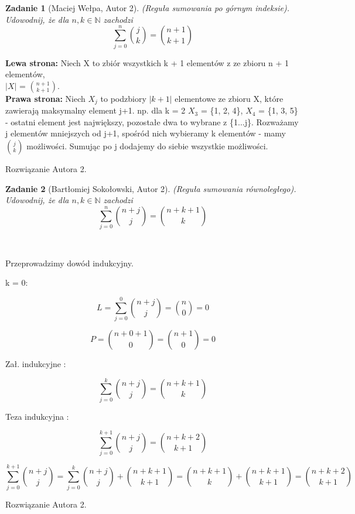 \documentclass{mwart}
\newtheorem{zad}{Zadanie}[section]
\begin{document}
\begin{zad}[Maciej Wełpa, Autor 2]
    (Reguła sumowania po górnym indeksie). Udowodnij, że dla
    $n, k \in \mathbb{N}$ zachodzi
    \[\sum_{j=0}^n\binom{j}{k} = \binom{n+1}{k+1}\]
\end{zad}
\begin{mdframed}
    \textbf{Lewa strona:}
    Niech X to zbiór wszystkich k + 1 elementów z ze zbioru n + 1 elementów, \\
    \(|X|\) = \(\binom{n + 1}{k + 1}\). \\
    \textbf{Prawa strona:} Niech \( X_j \) to podzbiory \(|k+1|\) elementowe ze zbioru X, które
    zawierają maksymalny element j+1. np. dla k = 2 \( X_3 \) = \{1, 2, 4\}, \( X_4 \) = \{1, 3, 5\}
    - ostatni element jest największy, pozostałe dwa to wybrane z \{1...j\}. Rozważamy j elementów mniejszych od j+1, spośród nich wybieramy k elementów - mamy \(\binom{j}{k}\) możliwości. Sumując po j dodajemy do siebie wszystkie możliwości.
\end{mdframed}
\begin{mdframed}
    Rozwiązanie Autora 2.
\end{mdframed}




\begin{zad}[Bartłomiej Sokołowski, Autor 2]
    (Reguła sumowania równoległego). Udowodnij, że dla $n, k \in \mathbb{N}$
    zachodzi \[ \sum_{j= 0}^{n}\binom{n+j}{j} = \binom{n+k+1}{k}   \]
\end{zad}\
\begin{mdframed}
    Przeprowadzimy dowód indukcyjny.
    \item k = 0:
    \item \[ L = \sum_{j=0}^{0}\binom{n+j}{j} = \binom{n}{0} = 0 \]
    \item \[P = \binom{n+0+1}{0} = \binom{n+1}{0} = 0\]
    \item Zał. indukcyjne :
    \item \[\sum_{j=0}^{k}\binom{n+j}{j} = \binom{n+k+1}{k}\]
    \item Teza indukcyjna :
    \item \[\sum_{j=0}^{k+1}\binom{n+j}{j} = \binom{n+k+2}{k+1}\]
    \item \[\sum_{j=0}^{k+1}\binom{n+j}{j} = \sum_{j=0}^{k}\binom{n+j}{j} + \binom{n+k+1}{k+1} = \binom{n+k+1}{k} + \binom{n+k+1}{k+1} = \binom{n+k+2}{k+1}\]
\end{mdframed}
\begin{mdframed}
    Rozwiązanie Autora 2.
\end{mdframed}
\end{document}
